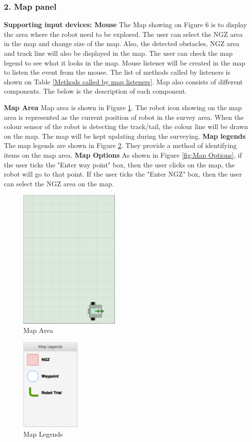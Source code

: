 \subsubsection{2. Map panel}
\textbf{Supporting input devices: Mouse}
The Map showing on Figure 6 is to display the area where the robot need to be explored. The user can select the NGZ area in the map and change size of the map. Also, the detected obstacles, NGZ area and track line will also be displayed in the map. The user can check the map legend to see what it looks in the map. Mouse listener will be created in the map to listen the event from the mouse. The list of methods called by listeners is shown on Table \ref{Methods called by map listeners}. Map also consists of different components. The below is the description of each component.

\textbf{Map Area}
Map area is shown in Figure \ref{fig:Map Area}. The robot icon showing on the map area is represented as the current position of robot in the survey area. When the colour sensor of the robot is detecting the track/tail, the colour line will be drawn on the map. The map will be kept updating during the surveying.
\textbf{Map legends}  
The map legends are shown in Figure \ref{fig:Map Legends}. They provide a method of identifying items on the map area.
\textbf{Map Options}
As shown in Figure \ref{fig:Map Options}, if the user ticks the "Enter way point" box, then the user clicks on the map, the robot will go to that point. If the user ticks the "Enter NGZ" box, then the user can select the NGZ area on the map.
	
\begin{figure}[H]
	\centering
	\includegraphics[width=50mm]{MapArea.png}  
	\caption{Map Area}
	\label{fig:Map Area}                
\end{figure}    

\begin{figure}[H]
	\centering
	\includegraphics[width=30mm]{maplegends.png}  
	\caption{Map Legends}
	\label{fig:Map Legends}                
\end{figure}

